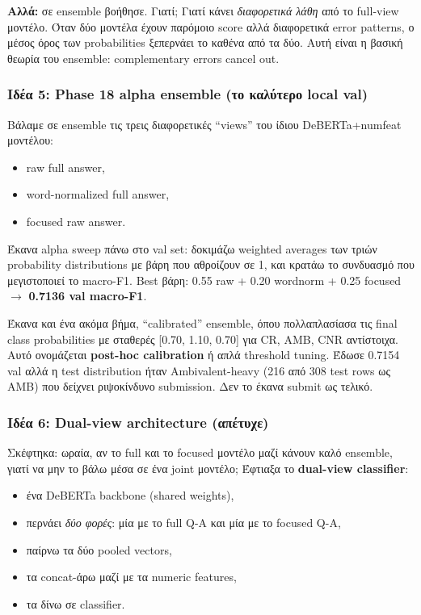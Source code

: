 \documentclass[12pt]{fphw}
\begin{document}
\textbf{Αλλά:} σε ensemble βοήθησε. Γιατί; Γιατί κάνει \emph{διαφορετικά λάθη} από το full-view μοντέλο. Όταν δύο μοντέλα έχουν παρόμοιο score αλλά διαφορετικά error patterns, ο μέσος όρος των probabilities ξεπερνάει το καθένα από τα δύο. Αυτή είναι η βασική θεωρία του ensemble: complementary errors cancel out.

\subsubsection{Ιδέα 5: Phase 18 alpha ensemble (το καλύτερο local val)}

Βάλαμε σε ensemble τις τρεις διαφορετικές ``views'' του ίδιου DeBERTa+numfeat μοντέλου:
\begin{itemize}
    \item raw full answer,
    \item word-normalized full answer,
    \item focused raw answer.
\end{itemize}

Έκανα alpha sweep πάνω στο val set: δοκιμάζω weighted averages των τριών probability distributions με βάρη που αθροίζουν σε 1, και κρατάω το συνδυασμό που μεγιστοποιεί το macro-F1. Best βάρη: 0.55 raw + 0.20 wordnorm + 0.25 focused $\rightarrow$ \textbf{0.7136 val macro-F1}.

Έκανα και ένα ακόμα βήμα, ``calibrated'' ensemble, όπου πολλαπλασίασα τις final class probabilities με σταθερές [0.70, 1.10, 0.70] για CR, AMB, CNR αντίστοιχα. Αυτό ονομάζεται \textbf{post-hoc calibration} ή απλά threshold tuning. Έδωσε 0.7154 val αλλά η test distribution ήταν Ambivalent-heavy (216 από 308 test rows ως AMB) που δείχνει ριψοκίνδυνο submission. Δεν το έκανα submit ως τελικό.

\subsubsection{Ιδέα 6: Dual-view architecture (απέτυχε)}

Σκέφτηκα: ωραία, αν το full και το focused μοντέλο μαζί κάνουν καλό ensemble, γιατί να μην το βάλω μέσα σε ένα joint μοντέλο; Έφτιαξα το \textbf{dual-view classifier}:

\begin{itemize}
    \item ένα DeBERTa backbone (shared weights),
    \item περνάει \emph{δύο φορές}: μία με το full Q-A και μία με το focused Q-A,
    \item παίρνω τα δύο pooled vectors,
    \item τα concat-άρω μαζί με τα numeric features,
    \item τα δίνω σε classifier.
\end{itemize}
\end{document}
